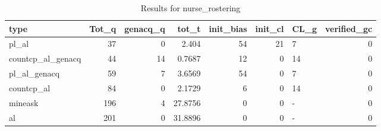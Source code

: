 \begin{table}[ht]
\caption{Results for nurse_rostering}
\begin{tabular}{lrrrrrlr}
\hline
 type              &   Tot\_q &   genacq\_q &   tot\_t &   init\_bias &   init\_cl & CL\_g   &   verified\_gc \\
\hline
 pl\_al             &      37 &          0 &  2.404  &          54 &        21 & 7      &             0 \\
 countcp\_al\_genacq &      44 &         14 &  0.7687 &          12 &         0 & 14     &             0 \\
 pl\_al\_genacq      &      59 &          7 &  3.6569 &          54 &         0 & 7      &             0 \\
 countcp\_al        &      84 &          0 &  2.1729 &           6 &         0 & 14     &             0 \\
 mineask           &     196 &          4 & 27.8756 &           0 &         0 & -      &             0 \\
 al                &     201 &          0 & 31.8896 &           0 &         0 & -      &             0 \\
\hline
\end{tabular}
\end{table}